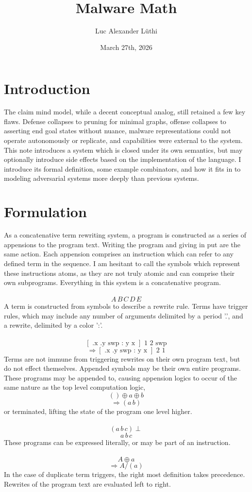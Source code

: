 \documentclass{article}
\title{Malware Math}
\author{Luc Alexander L{\"u}thi}
\date{March 27th, 2026}
\begin{document}
	\maketitle
	\tableofcontents
	\section{Introduction}
	The claim mind model, while a decent conceptual analog, still retained a few key flaws. Defense collapses to pruning for minimal graphs, offense collapses to asserting end goal states without nuance, malware representations could not operate autonomously or replicate, and capabilities were external to the system. This note introduces a system which is closed under its own semantics, but may optionally introduce side effects based on the implementation of the language. I introduce its formal definition, some example combinators, and how it fits in to modeling adversarial systems more deeply than previous systems. 
	\section{Formulation}
	As a concatenative term rewriting system, a program is constructed as a series of appensions to the program text. Writing the program and giving in put are the same action. Each appension comprises an instruction which can refer to any defined term in the sequence. I am hesitant to call the symbols which represent these instructions atoms, as they are not truly atomic and can comprise their own subprograms. Everything in this system is a concatenative program.\\\\
	$$A\,B\,C\,D\,E$$
	A term is constructed from symbols to describe a rewrite rule. Terms have trigger rules, which may include any number of arguments delimited by a period '.', and a rewrite, delimited by a color ':'.\\\\
	$$[ \text{ .x .y swp : y x } ] \text{ 1 2 swp}$$
	$$ \Rightarrow [ \text{ .x .y swp : y x } ] \text{ 2 1}$$
	Terms are not immune from triggering rewrites on their own program text, but do not effect themselves. Appended symbols may be their own entire programs. These programs may be appended to, causing appension logics to occur of the same nature as the top level computation logic,
	$$() \oplus a \oplus b$$
	$$ \Rightarrow (a\,b)$$
	or terminated, lifting the state of the program one level higher.\\\\
	$$(a\,b\,c) \perp$$
	$$a\,b\,c$$
	These programs can be expressed literally, or may be part of an instruction.\\\\
	$$A \oplus a$$
	$$ \Rightarrow A/(a)$$
	In the case of duplicate term triggers, the right most definition takes precedence. Rewrites of the program text are evaluated left to right. 
\end{document}
